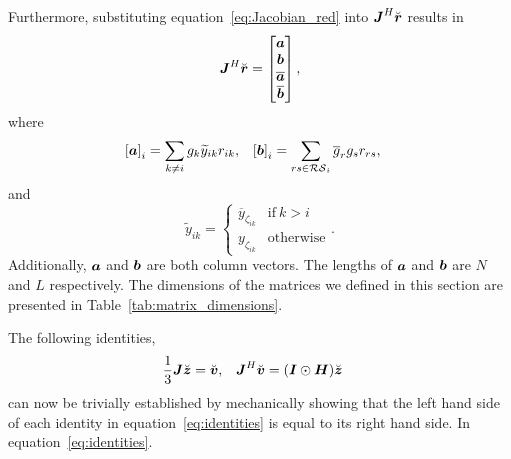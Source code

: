 \documentclass[useAMS,usenatbib]{mn2e}
\newcommand{\bz}{\bmath{z}}
\newcommand{\br}{\bmath{r}}
\newcommand{\bv}{\bmath{v}}
\newcommand{\bJ}{\bmath{J}}
\newcommand{\bH}{\bmath{H}}
\newcommand{\bI}{\bmath{I}}
\newcommand{\ba}{\bmath{a}}
\newcommand{\bb}{\bmath{b}}
\newcommand{\conj}[1]{\overline{#1}}
\begin{document}
Furthermore, substituting equation~\ref{eq:Jacobian_red} into $\bJ^H\breve{\br}$ results in
\begin{equation}
\bJ^H\breve{\br} = \begin{bmatrix}
                   \ba \\
                   \bb \\
                   \conj{\ba}\\
                   \conj{\bb}
                   \end{bmatrix},
\end{equation}
where
\begin{align}
\label{eq:ab}
\left [ \ba \right ]_i &= \sum_{k\neq i} g_k \widetilde{y}_{ik}r_{ik},  & \left [ \bb \right ]_i &= \sum_{rs\in\mathcal{RS}_i}\conj{g}_r g_s r_{rs},
\end{align}
and
\begin{equation}
\label{eq:y_tilde}
\widetilde{y}_{ik} = 
\begin{cases}
\conj{y}_{\zeta_{ik}} & \textrm{if}~k > i\\
y_{\zeta_{ik}} & \textrm{otherwise}
\end{cases}.
\end{equation}
Additionally, $\ba$ and $\bb$ are both column vectors. The lengths of $\ba$ and $\bb$ are $N$ and $L$ respectively.
The dimensions of the matrices we defined in this section are presented in Table~\ref{tab:matrix_dimensions}.

The following identities,
\begin{align}
\label{eq:identities}
\frac{1}{3}\bJ\breve{\bz} &= \breve{\bv}, & \bJ^H\breve{\bv} &= (\bI\odot\bH)\breve{\bz} 
\end{align}
can now be trivially established by mechanically showing that the left hand side of each identity in equation~\ref{eq:identities} is equal to its right hand side.
In equation~\ref{eq:identities}.
\end{document}
